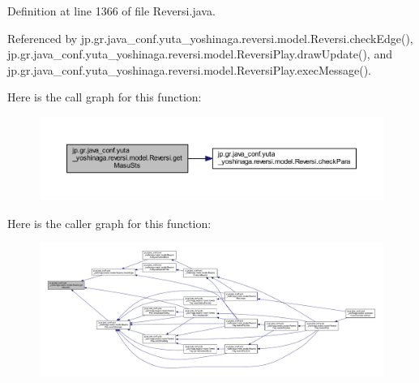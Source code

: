 Definition at line 1366 of file Reversi.\+java.



Referenced by jp.\+gr.\+java\+\_\+conf.\+yuta\+\_\+yoshinaga.\+reversi.\+model.\+Reversi.\+check\+Edge(), jp.\+gr.\+java\+\_\+conf.\+yuta\+\_\+yoshinaga.\+reversi.\+model.\+Reversi\+Play.\+draw\+Update(), and jp.\+gr.\+java\+\_\+conf.\+yuta\+\_\+yoshinaga.\+reversi.\+model.\+Reversi\+Play.\+exec\+Message().

Here is the call graph for this function\+:
\nopagebreak
\begin{figure}[H]
\begin{center}
\leavevmode
\includegraphics[width=350pt]{classjp_1_1gr_1_1java__conf_1_1yuta__yoshinaga_1_1reversi_1_1model_1_1_reversi_aaab64f3b70ed5da5f0707933cbf82802_cgraph}
\end{center}
\end{figure}
Here is the caller graph for this function\+:
\nopagebreak
\begin{figure}[H]
\begin{center}
\leavevmode
\includegraphics[width=350pt]{classjp_1_1gr_1_1java__conf_1_1yuta__yoshinaga_1_1reversi_1_1model_1_1_reversi_aaab64f3b70ed5da5f0707933cbf82802_icgraph}
\end{center}
\end{figure}
\mbox{\label{classjp_1_1gr_1_1java__conf_1_1yuta__yoshinaga_1_1reversi_1_1model_1_1_reversi_a1a528710342faba65975f4768d24b129}} 
